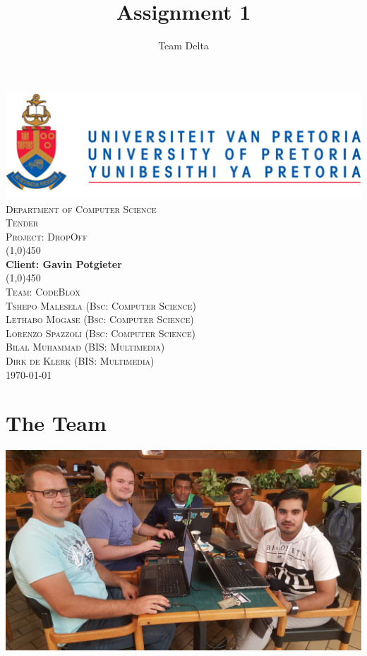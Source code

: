 \documentclass[a4paper,12pt]{article}
\author{Team Delta}
\title{ Assignment 1}
\begin{document}
	\setlength{\parskip}{6pt}
	
	\begin{titlepage}
		\begin{center}
			\includegraphics[width=1\textwidth]{./Pictures/up_logo.png}\\[1.5cm] 
			\textsc{\LARGE Department of Computer Science} \\ [.5cm]
			\textsc{\Large Tender} \\ [.5cm]
			\textsc{\Large Project: DropOff} \\ [.5cm]
			\line(1,0){450}\\[.5cm]
			\huge{\bfseries Client: Gavin Potgieter}\\
			\line(1,0){450}\\[.5cm]
			\textsc{\LARGE Team: CodeBlox}\\ [0.5cm]
			
			
			\textsc{\large Tshepo Malesela (Bsc: Computer Science)}\\
			\textsc{\large Lethabo Mogase (Bsc: Computer Science)}\\
			\textsc{\large Lorenzo Spazzoli (Bsc: Computer Science)}\\
			\textsc{\large Bilal Muhammad (BIS: Multimedia)}\\
			\textsc{\large Dirk de Klerk (BIS: Multimedia)}\\ [3.9cm]
			
			\large\today
		\end{center}
	\end{titlepage}
	
	\tableofcontents
	\thispagestyle{empty}
	\footnotesize
	\normalsize
	
	
	
	
	\newpage
	\section{The Team}
	
	\includegraphics[width=1\textwidth]{./Pictures/the_group.jpg}\\
	
\end{document}
